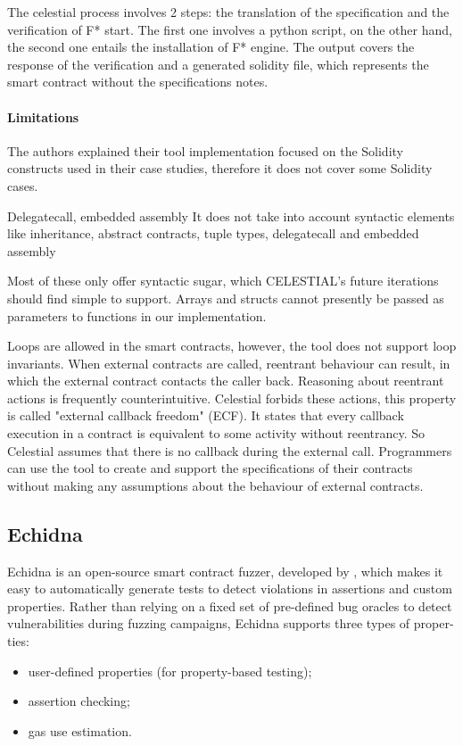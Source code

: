 The celestial process involves 2 steps: the translation of the specification and the verification of F* start. 
The first one involves a python script, on the other hand, the second one entails the installation of F* engine. 
The output covers the response of the verification and a generated solidity file, which represents the smart contract without the specifications notes. 

\paragraph{Limitations} 
The authors explained their tool implementation focused on the Solidity constructs used in their case studies, therefore it does not cover some Solidity cases. 

Delegatecall, embedded assembly
It does not take into account syntactic elements like inheritance, abstract contracts, tuple types, delegatecall and  embedded assembly

Most of these only offer syntactic sugar, which CELESTIAL's future iterations should find simple to support.
Arrays and structs cannot presently be passed as parameters to functions in our implementation. 

Loops are allowed in the smart contracts, however, the tool does not support loop invariants.
When external contracts are called, reentrant behaviour can result, in which the external contract contacts the caller back.
Reasoning about reentrant actions is frequently counterintuitive.
Celestial forbids these actions, this property is called "external callback freedom" (ECF). It states that every callback execution 
in a contract is equivalent to some activity without reentrancy.
So Celestial assumes that there is no callback during the external call.
Programmers can use the tool to create and support the specifications of their contracts without making any assumptions about the behaviour of external contracts. 

\subsection{Echidna}
\label{sec:Specification:Echidna}
Echidna is an open-source smart contract fuzzer, developed by \citet{Echidna}, which makes it easy to automatically generate tests to detect violations in
assertions and custom properties.
Rather than relying on a fixed set of pre-defined bug oracles to detect vulnerabilities
during fuzzing campaigns, Echidna supports three types of proper-
ties: 
\begin{itemize}
    \item user-defined properties (for property-based testing);
    \item assertion checking;
    \item gas use estimation.
\end{itemize}

